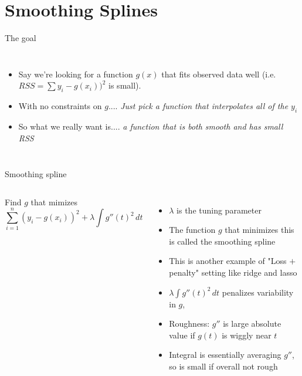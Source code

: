 \documentclass[aspectratio=169,usenames,dvipsnames]{beamer}
\newcommand{\InstructorNotes}[1]{\textit{\color{orange}#1}}
\newcommand{\InstructorList}[1]{
\begin{itemize}
	\color{orange}
	#1
\end{itemize}
}
\begin{document}
\section{Smoothing Splines}
\begin{frame}[t]{The goal}

\begin{columns}
\centering
\begin{itemize}
	\item
Say we're looking for a function $g(x)$ that fits observed data well (i.e.~$RSS = \sum y_i - g(x_i))^2$ is small).
\item With no constraints on $g$.... \InstructorNotes{Just pick a function that interpolates all of the $y_i$}
\vspace{.5in}
\item So what we really want is.... \InstructorNotes{a function that is both smooth and has small RSS}
\end{itemize}
\centering

\end{columns}

\end{frame}


\begin{frame}[t]{Smoothing spline }

\begin{columns}
\centering
Find $g$ that mimizes
\begin{equation*}
	\sum_{i=1}^n (y_i-g(x_i))^2 + \lambda \int g''(t)^2 \,dt
\end{equation*}
\InstructorList{
\item $\lambda$ is the tuning parameter
\item The function $g$ that minimizes this is called the smoothing spline
\item This is another example of "Loss $+$ penalty" setting like ridge and lasso
\item $\lambda \int g''(t)^2 \,dt$ penalizes variability in $g$,
\item Roughness: $g''$ is large absolute value if $g(t)$ is wiggly near $t$
\item Integral is essentially averaging $g''$, so is small if overall not rough
}
\centering



\end{columns}

\end{frame}
\end{document}

